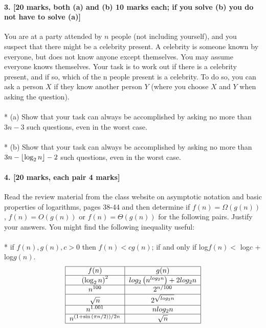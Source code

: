 \documentclass[a4paper]{scrartcl}
\begin{document}
\paragraph{3. [20 marks, both (a) and (b) 10 marks each; if you solve (b) you do not have to
solve (a)]}
\label{sec:Question 3}
You are at a party attended by $n$ people (not including yourself), and you suspect that there might be a celebrity present. A celebrity is someone known by everyone, but does not know anyone except themselves. You may assume everyone knows themselves. Your task is to work out if there is a celebrity present, and if so, which of the n people present is a celebrity. To do so, you can ask a person $X$ if they know another person $Y$ (where you choose $X$ and $Y$ when asking the question).\\
\\*
(a) Show that your task can always be accomplished by asking no more than $3n-3$ such questions, even in the worst case.\\
\\*
(b) Show that your task can always be accomplished by asking no more than $3n-\left\lfloor \log_2{n} \right\rfloor-2$ such questions, even in the worst case.

\paragraph{4. [20 marks, each pair 4 marks]}
\label{sec:Question 4}
Read the review material from the class website on asymptotic notation and basic properties of logarithms, pages 38-44 and then determine if $f(n) = \Omega(g(n))$, $f(n) = O(g(n))$ or $f (n) = \Theta(g(n))$ for the following pairs. Justify your answers. You might find the following inequality useful: \\
\\*
if $f (n), g(n), c > 0$ then $f (n) < c g(n)$; if and only if log$f(n) <$ log$c$ + log$g(n)$.
\begin{align*}
\begin{tabular}{|c | c |}
  \hline
  $f(n)$ & $g(n)$ \\
  \hline
  $\left(\log_2n\right)^2$ & $log_2\left(n^{log_2{n}}\right) + 2 log_2n$ \\
  \hline
  $n^{100}$ & $2^{n/100}$ \\
  \hline
  $\sqrt{n}$ & $2^{\sqrt{log_2 n}}$\\
    \hline
  $n^{1.001}$ & $n log_2 n$\\
  \hline
  $n^{(1+\sin{(\pi n/2))}/2n}$ &  $\sqrt{n}$\\
  \hline
\end{tabular}
\end{align*}
\end{document}
